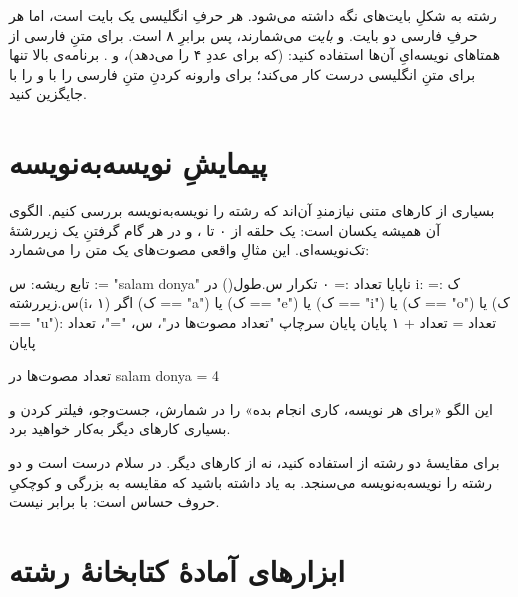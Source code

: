 \begin{warn}
رشته به شکلِ بایت‌های  نگه داشته می‌شود. هر حرفِ انگلیسی یک بایت است،
اما هر حرفِ فارسی دو بایت.  و  \emph{بایت}
می‌شمارند، پس  برابرِ ۸ است. برای متنِ فارسی از همتاهای
نویسه‌ایِ آن‌ها استفاده کنید:  (که برای  عددِ ۴
را می‌دهد)،  و . برنامه‌ی
بالا تنها برای متنِ انگلیسی درست کار می‌کند؛ برای وارونه کردنِ متنِ فارسی
 را با  و  را با 
جایگزین کنید.
\end{warn}

\section{پیمایشِ نویسه‌به‌نویسه}

بسیاری از کارهای متنی نیازمندِ آن‌اند که رشته را نویسه‌به‌نویسه بررسی کنیم. الگوی
آن همیشه یکسان است: یک حلقه از ۰ تا ، و در هر گام گرفتنِ یک
زیررشتهٔ تک‌نویسه‌ای. این مثالِ واقعی مصوت‌های یک متن را می‌شمارد:

\begin{salamfa}
تابع ریشه:
    س := "salam donya"
    ناپایا تعداد := ۰
    تکرار س.طول() در i:
        ک := س.زیررشته(i، ۱)
        اگر (ک == "a") یا (ک == "e") یا (ک == "i") یا (ک == "o") یا (ک == "u"):
            تعداد = تعداد + ۱
        پایان
    پایان
    سرچاپ "تعداد مصوت‌ها در"، س، "="، تعداد
پایان
\end{salamfa}

\begin{progoutfa}
تعداد مصوت‌ها در salam donya = 4
\end{progoutfa}

این الگو «برای هر نویسه، کاری انجام بده» را در شمارش، جست‌وجو، فیلتر
کردن و بسیاری کارهای دیگر به‌کار خواهید برد.

\begin{warn}
برای مقایسهٔ دو رشته از \code{==} استفاده کنید، نه از کارهای دیگر. در سلام
 درست است و دو رشته را نویسه‌به‌نویسه می‌سنجد. به یاد داشته
باشید که مقایسه به بزرگی و کوچکیِ حروف حساس است:  با 
برابر نیست.
\end{warn}

\section{ابزارهای آمادهٔ کتابخانهٔ رشته}

